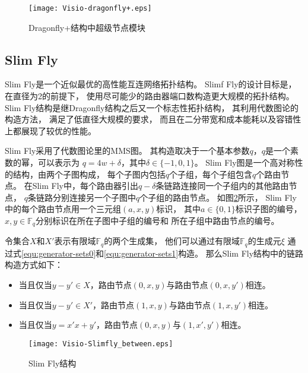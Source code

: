 \begin{figure}[htp]
  \centering
    \texttt{[image: Visio-dragonfly+.eps]}
    \caption{Dragonfly+结构中超级节点模块}
    \label{dragonfly+}
\end{figure}

\subsection{Slim Fly}
Slim Fly是一个近似最优的高性能互连网络拓扑结构。
Slimf Fly的设计目标是，在直径为2的前提下，
使用尽可能少的路由器端口数构造更大规模的拓扑结构。
Slim Fly结构是继Dragonfly结构之后又一个标志性拓扑结构，
其利用代数图论的构造方法，
满足了低直径大规模的要求，
而且在二分带宽和成本能耗以及容错性上都展现了较优的性能。

Slim Fly采用了代数图论里的MMS图。
其构造取决于一个基本参数$q$，$q$是一个素数的幂，可以表示为
$q=4w+\delta$，其中$\delta \in \{-1,0,1\}$。
Slim Fly图是一个高对称性的结构，由两个子图构成，
每个子图内包括$q$个子组，每个子组包含$q$个路由节点。
在Slim Fly中，每个路由器引出$q-\delta$条链路连接同一个子组内的其他路由节点，
$q$条链路分别连接另一个子图中$q$个子组的路由节点。
如图\ref{slimflyone}所示，
Slim Fly中的每个路由节点用一个三元组$(a,x,y)$标识，
其中$a\in \{0,1\}$标识子图的编号，
$x,y\in\mathds{F}_q$分别标识在所在子图中子组的编号和
所在子组中路由节点的编号。

令集合$X$和$X'$表示有限域$\mathds{F}_q$的两个生成集，
他们可以通过有限域$\mathds{F}_q$的生成元$\xi$
通过式\ref{equ:generator-sets0}和\ref{equ:generator-sets1}构造。
那么Slim Fly结构中的链路构造方式如下：
\begin{itemize}
\item 当且仅当$y-y' \in X$，路由节点$(0,x,y)$与路由节点$(0,x,y')$相连。
\item 当且仅当$y-y' \in X'$，路由节点$(1,x,y)$与路由节点$(1,x,y')$相连。
\item 当且仅当$y=x'x+y'$，路由节点$(0,x,y)$与$(1,x',y')$相连。
\end{itemize}

\begin{figure}
  \centering
    \texttt{[image: Visio-Slimfly\_between.eps]}
    \caption{Slim Fly结构}
    \label{slimflyone}
\end{figure}

